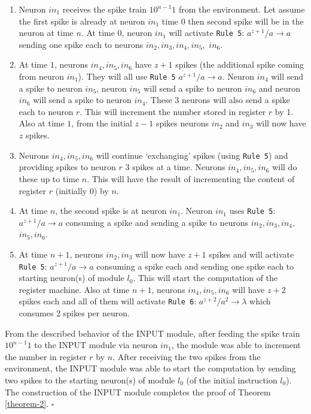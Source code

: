 \documentclass[runningheads,a4paper]{llncs}
\begin{document}
\begin{enumerate}
   \item Neuron $in_1$ receives the spike train $10^{n-1}1$ from the environment. Let assume the first spike is already at neuron $in_1$ time $0$
         then second spike will be in the neuron at time $n$. At time $0$, neuron $in_1$ will activate \texttt{Rule 5}: $a^{z+1}/a \rightarrow a$  
          sending one spike each to neurons $in_2, in_3, in_4, in_5,$ $ in_6$.
   \item At time $1$, neurons $in_4, in_5, in_6$ have $z+1$ spikes (the additional spike coming from neuron $in_1$). They will all use 
         \texttt{Rule 5} $a^{z+1}/a \rightarrow a$. Neuron $in_4$ will send a spike to neuron $in_5$, neuron $in_5$ will send a spike to neuron
         $in_6$ and neuron $in_6$ will send a spike to neuron $in_4$. These 3 neurons will also send a spike each to neuron $r$. This will increment
         the number stored in register $r$ by 1. Also at time $1$, from the initial $z-1$ spikes neurons $in_2$ and $in_3$ will now have $z$ spikes.
   \item Neurons $in_4, in_5, in_6$ will continue `exchanging' spikes (using \texttt{Rule 5}) and providing spikes to neuron $r$ 3 spikes at a time.
         Neurons $in_4, in_5, in_6$ will do these up to time $n$. This will have the result of incrementing the content of register $r$ (initially 0)
         by $n$.
   \item At time $n$, the second spike is at neuron $in_1$. Neuron $in_1$ uses \texttt{Rule 5}: $a^{z+1}/a \rightarrow a$ consuming a spike and 
         sending a spike to neurons $in_2,in_3, in_4,$ $in_5, in_6$.
   \item At time $n+1$, neurons $in_2, in_3$ will now have $z+1$ spikes and will activate \texttt{Rule 5}: $a^{z+1}/a \rightarrow a$ consuming a spike 
         each and sending one spike each to starting neuron(s) of module $l_{0}$. This will start the computation of the register machine. Also 
         at time $n+1$, neurons $in_4, in_5, in_6$ will have $z+2$ spikes each and all of them will activate \texttt{Rule 6}: $a^{z+2}/a^2 \rightarrow 
         \lambda$ which consumes 2 spikes per neuron.
\end{enumerate}

From the described behavior of the INPUT module, after feeding the spike train $10^{n-1}1$ to the INPUT module via neuron $in_1$, the module was able
to increment the number in register $r$ by $n$. After receiving the two spikes from the environment, the INPUT module was able to start the 
computation by sending two spikes to the starting neuron(s) of module $l_0$ (of the initial instruction $l_0$). The construction of the INPUT module
completes the proof of Theorem \ref{theorem-2}. $\square$
   
\end{document}
